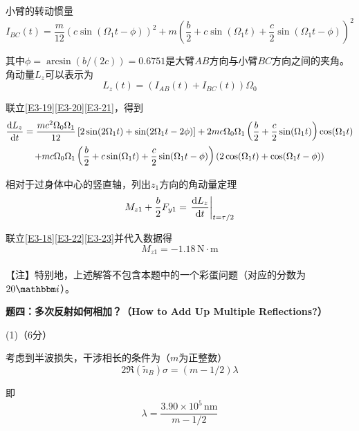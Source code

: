 \documentclass[10pt,a4paper,onecolumn,UTF8]{ctexart}
\begin{document}
	小臂的转动惯量
	\begin{equation}\label{E3-20}
		I_{BC}(t)=\frac{m}{12}(c\sin(\Omega_1t-\phi))^2+m\left(\frac b 2+c\sin(\Omega_1t)+\frac c 2\sin(\Omega_1t-\phi)\right)^2
	\end{equation}
	
	其中$\phi=\arcsin(b/(2c))=0.6751$是大臂$AB$方向与小臂$BC$方向之间的夹角。角动量$L_z$可以表示为
	\begin{equation}\label{E3-21}
		L_z(t)=(I_{AB}(t)+I_{BC}(t))\Omega_0
	\end{equation}
	
	联立\eqref{E3-19}\eqref{E3-20}\eqref{E3-21}，得到
	\begin{multline}\label{E3-22}
		\frac{\mathrm{d} L_z}{\mathrm{d} t}=\frac{mc^2\Omega_0\Omega_1}{12}\left[2\sin(2\Omega_1t)+\sin(2\Omega_1t-2\phi)\right]+2mc\Omega_0\Omega_1\left(\frac b 2+\frac c 2\sin(\Omega_1t)\right)\cos(\Omega_1t)\\+mc\Omega_0\Omega_1\left(\frac b 2+c\sin(\Omega_1t)+\frac c 2\sin(\Omega_1t-\phi)\right)\left(2\cos(\Omega_1t)+\cos(\Omega_1t-\phi)\right)
	\end{multline}
	
	相对于过身体中心的竖直轴，列出$z_1$方向的角动量定理
	\begin{equation}\label{E3-23}
		M_{z1}+\frac b 2F_{y1}=\left.\frac{\mathrm{d} L_z}{\mathrm{d} t}\right|_{t=\tau/2}
	\end{equation}
	
	联立\eqref{E3-18}\eqref{E3-22}\eqref{E3-23}并代入数据得
	\begin{equation}
		M_{z1}=-1.18\,\text{N}\cdot\text{m}
	\end{equation}\\
	
	【注】特别地，上述解答不包含本题中的一个彩蛋问题（对应的分数为$20\ui$）。
	
	
	\setcounter{equation}{0}
	\newpage
	
	\noindent
	\textbf{题四：多次反射如何相加？（How to Add Up Multiple Reflections?）}
	
	(1)（6分）
	
	考虑到半波损失，干涉相长的条件为（$m$为正整数）
	\begin{equation}
		2\Re(\tilde{n}_B)\sigma=(m-1/2)\lambda
	\end{equation}
	
	即
	\begin{equation}
		\lambda=\frac{3.90\times10^{5}\,\text{nm}}{m-1/2}
	\end{equation}
	
\end{document}

